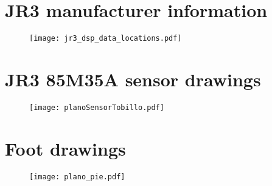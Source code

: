 \chapter{JR3 manufacturer information}\label{app:jr3card}

\begin{figure}[!hbt]
\centering
\texttt{[image: jr3\_dsp\_data\_locations.pdf]}
\end{figure}

\chapter{JR3 85M35A sensor drawings} \label{app:sensorDraw}

\begin{figure}[!hbt]
\centering
\texttt{[image: planoSensorTobillo.pdf]}
\end{figure}

\chapter{Foot drawings} \label{app:footDraw}
\begin{figure}
\centering
\texttt{[image: plano\_pie.pdf]}
\end{figure}